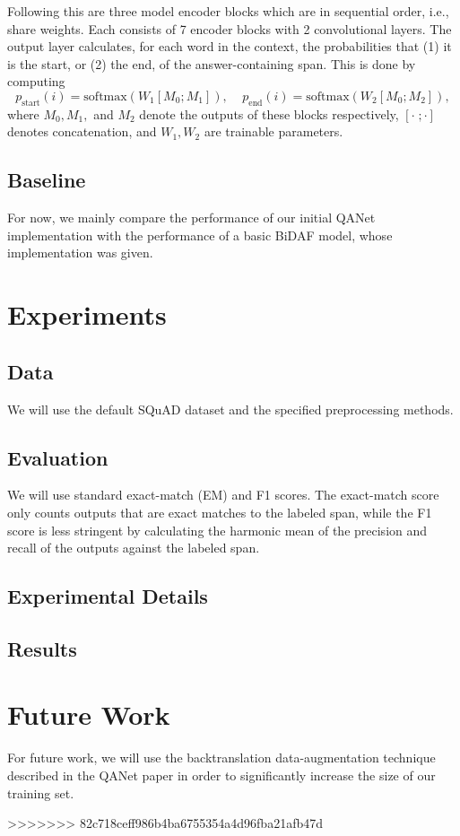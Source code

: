 \documentclass{article}
\begin{document}
Following this are three model encoder blocks which are in sequential order, i.e., share weights. Each consists of 7 encoder blocks with 2 convolutional layers. The output layer calculates, for each word in the context, the probabilities that (1) it is the start, or (2) the end, of the answer-containing span. This is done by computing 
$$p_{\text{start}}(i)=\text{softmax}(W_1[M_0;M_1]),\;\;\;\; p_{\text{end}}(i)=\text{softmax}(W_2[M_0;M_2]),$$
where $M_0,M_1,$ and $M_2$ denote the outputs of these blocks respectively, $[\cdot \;; \cdot]$ denotes concatenation, and $W_1,W_2$ are trainable parameters.

\subsection{Baseline}
For now, we mainly compare the performance of our initial QANet implementation with the performance of a basic BiDAF model, whose implementation was given.

\section{Experiments}
\subsection{Data}
We will use the default SQuAD dataset and the specified preprocessing methods.

\subsection{Evaluation}
We will use standard exact-match (EM) and F1 scores. The exact-match score only counts outputs that are exact matches to the labeled span, while the F1 score is less stringent by calculating the harmonic mean of the precision and recall of the outputs against the labeled span.

\subsection{Experimental Details}

\subsection{Results}

\section{Future Work}
For future work, we will use the backtranslation data-augmentation technique described in the QANet paper in order to significantly increase the size of our training set.


>>>>>>> 82c718ceff986b4ba6755354a4d96fba21afb47d

\end{document}
